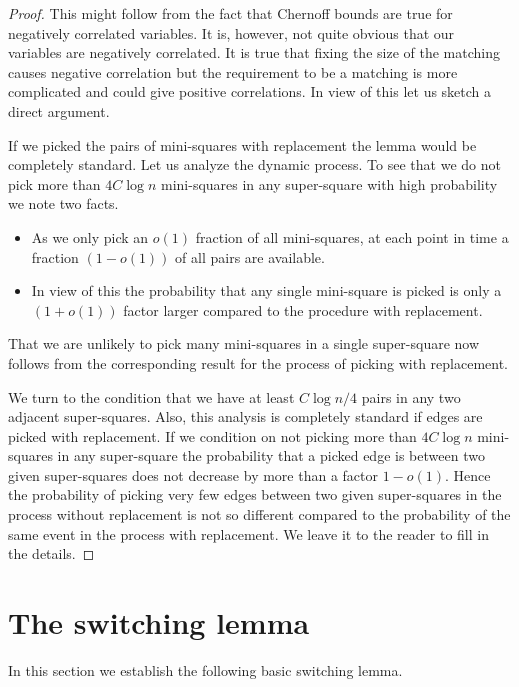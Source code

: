 \documentclass{theoretics}
\begin{document}
\begin{proof}
This might follow
from the fact that Chernoff bounds are true for
negatively correlated variables.  It is, however,
not quite obvious that
our variables are negatively correlated.  It is true that
fixing the size of the matching causes negative correlation
but the requirement to be a matching is more complicated
and could give positive correlations.  In view of this
let us sketch a direct argument.

If we picked the pairs of mini-squares
with replacement the lemma would be completely standard.  
Let us analyze the dynamic process. To see
that we do not pick more than $4C \log n$ mini-squares
in any super-square with high probability we note two
facts.

\begin{itemize}

\item As we only pick an $o(1)$ fraction of all mini-squares,
at each point in time a fraction $(1-o(1))$ of all pairs
are available.

\item In view of this the probability that any
single mini-square is picked is only a $(1+o(1))$
factor larger compared to the procedure 
with replacement.

\end{itemize}
That we are unlikely to pick many mini-squares in a single
super-square now follows from the corresponding result
for the process of picking with replacement.

We turn to the condition that we have at 
least $C \log n /4$ pairs in any two adjacent super-squares.
Also, this analysis is completely standard if edges are picked with
replacement.  If we condition on not picking more than $4C \log n$
mini-squares in any super-square the probability that a picked edge is between
two given super-squares does not decrease by more than a factor
$1-o(1)$.  Hence the probability of picking very few edges
between two given super-squares in the process without replacement 
is not so different compared to the probability of
the same event in the process with replacement.
We leave it to the reader to fill in the details.
\end{proof}

\section{The switching lemma} \label{sec:switch}
In this section we establish the following basic
switching lemma.
\end{document}
